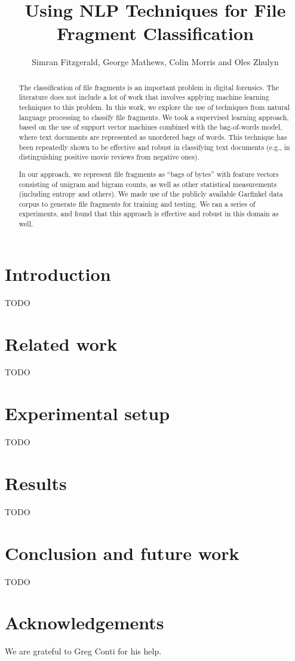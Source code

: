\documentclass[letter,11pt]{article}
\title{Using NLP Techniques for File Fragment Classification}
\author{Simran Fitzgerald, George Mathews, Colin Morris and Oles Zhulyn}
\begin{document}
\maketitle

\begin{abstract}
The classification of file fragments is an important problem in digital forensics. The literature does not include a lot of work that involves applying machine learning techniques to this problem. In this work, we explore the use of techniques from natural language processing to classify file fragments. We took a supervised learning approach, based on the use of support vector machines combined with the bag-of-words model, where text documents are represented as unordered bags of words. This technique has been repeatedly shown to be effective and robust in classifying text documents (e.g., in distinguishing positive movie reviews from negative ones).

In our approach, we represent file fragments as ``bags of bytes'' with feature vectors consisting of unigram and bigram counts, as well as other statistical measurements (including entropy and others). We made use of the publicly available Garfinkel data corpus to generate file fragments for training and testing. We ran a series of experiments, and found that this approach is effective and robust in this domain as well.
\end{abstract}

\section{Introduction}
TODO \cite{Conti10, Garfinkel09, Axelsson10, Calhoun08, Li10}

\section{Related work}
TODO

\section{Experimental setup}
TODO

\section{Results}
TODO

\section{Conclusion and future work}
TODO

\section*{Acknowledgements}
We are grateful to Greg Conti for his help.


\newpage


\end{document}
